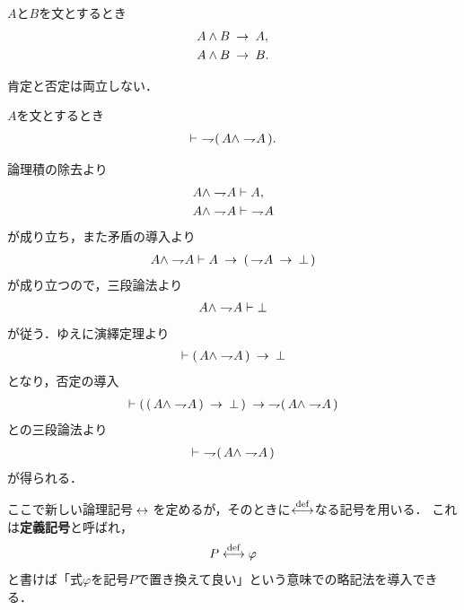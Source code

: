	\begin{screen}
		\begin{logicalaxm}[論理積の除去]
		\label{logicalaxm:elimination_of_conjunction}
			$A$と$B$を文とするとき
			\begin{align}
				A \wedge B &\hspace{0.25em}\rightarrow\hspace{0.25em} A, \\
				A \wedge B &\hspace{0.25em}\rightarrow\hspace{0.25em} B.
			\end{align}
		\end{logicalaxm}
	\end{screen}
	
	肯定と否定は両立しない．
	
	\begin{screen}
		\begin{logicalthm}[無矛盾律]
		\label{logicalthm:law_of_noncontradiction}
			$A$を文とするとき
			\begin{align}
				\vdash\ \rightharpoondown\hspace{-0.25em} (\, A \wedge \rightharpoondown\hspace{-0.25em} A\, ).
			\end{align}
		\end{logicalthm}
	\end{screen}
	
	\begin{prf}
		論理積の除去より
		\begin{align}
			A \wedge \rightharpoondown\hspace{-0.25em} A &\vdash A, \\
			A \wedge \rightharpoondown\hspace{-0.25em} A &\vdash\ \rightharpoondown\hspace{-0.25em} A
		\end{align}
		が成り立ち，また矛盾の導入より
		\begin{align}
			A \wedge \rightharpoondown\hspace{-0.25em} A \vdash A \hspace{0.25em}\rightarrow\hspace{0.25em} (\, \rightharpoondown\hspace{-0.25em} A \hspace{0.25em}\rightarrow\hspace{0.25em} \bot\, )
		\end{align}
		が成り立つので，三段論法より
		\begin{align}
			A \wedge \rightharpoondown\hspace{-0.25em} A \vdash \bot
		\end{align}
		が従う．ゆえに演繹定理より
		\begin{align}
			\vdash (\, A \wedge \rightharpoondown\hspace{-0.25em} A\, ) \hspace{0.25em}\rightarrow\hspace{0.25em} \bot
		\end{align}
		となり，否定の導入
		\begin{align}
			\vdash (\, (\, A \wedge \rightharpoondown\hspace{-0.25em} A\, ) \hspace{0.25em}\rightarrow\hspace{0.25em} \bot\, )
			\hspace{0.25em}\rightarrow\hspace{0.25em} \rightharpoondown\hspace{-0.25em} (\, A \wedge \rightharpoondown\hspace{-0.25em} A\, )
		\end{align}
		との三段論法より
		\begin{align}
			\vdash\ \rightharpoondown\hspace{-0.25em} (\, A \wedge \rightharpoondown\hspace{-0.25em} A\, )
		\end{align}
		が得られる．
		\QED
	\end{prf}
	
	ここで新しい論理記号$\hspace{0.25em}\leftrightarrow\hspace{0.25em}$を定めるが，そのときに$\overset{\mathrm{def}}{\longleftrightarrow}$なる記号を用いる．
	これは{\bf 定義記号}と呼ばれ，
	\begin{align}
		P \overset{\mathrm{def}}{\longleftrightarrow} \varphi
		\label{fom:defining_arrow}
	\end{align}
	と書けば「式$\varphi$を記号$P$で置き換えて良い」という意味での略記法を導入できる．
	
